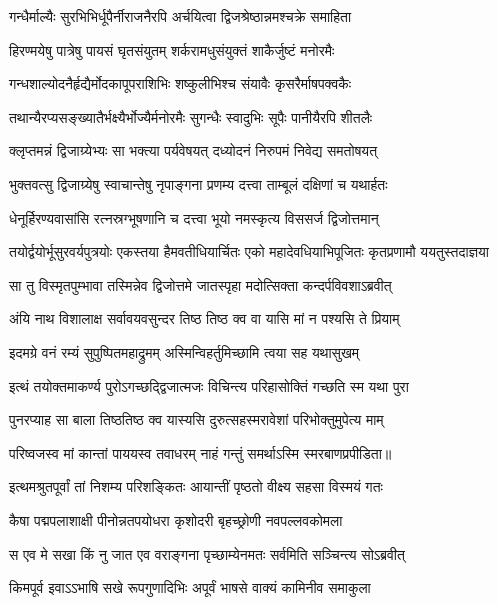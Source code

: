 \twolineshloka
{गन्धैर्माल्यैः सुरभिभिर्धूपैर्नीराजनैरपि}
{अर्चयित्वा द्विजश्रेष्ठान्नमश्चक्रे समाहिता} %

\twolineshloka
{हिरण्मयेषु पात्रेषु पायसं घृतसंयुतम्}
{शर्करामधुसंयुक्तं शाकैर्जुष्टं मनोरमैः} %

\twolineshloka
{गन्धशाल्योदनैर्हृद्यैर्मोदकापूपराशिभिः}
{शष्कुलीभिश्च संयावैः कृसरैर्माषपक्वकैः} %

\twolineshloka
{तथान्यैरप्यसङ्ख्यातैर्भक्ष्यैर्भोज्यैर्मनोरमैः}
{सुगन्धैः स्वादुभिः सूपैः पानीयैरपि शीतलैः} %

\twolineshloka
{क्लृप्तमन्नं द्विजाग्र्येभ्यः सा भक्त्या पर्यवेषयत्}
{दध्योदनं निरुपमं निवेद्य समतोषयत्} %

\twolineshloka
{भुक्तवत्सु द्विजाग्र्येषु स्वाचान्तेषु नृपाङ्गना}
{प्रणम्य दत्त्वा ताम्बूलं दक्षिणां च यथार्हतः} %

\twolineshloka
{धेनूर्हिरण्यवासांसि रत्नस्रग्भूषणानि च}
{दत्त्वा भूयो नमस्कृत्य विससर्ज द्विजोत्तमान्} %

\fourlineindentedshloka
{तयोर्द्वयोर्भूसुरवर्यपुत्रयोः}
{एकस्तया हैमवतीधियार्चितः}
{एको महादेवधियाभिपूजितः}
{कृतप्रणामौ ययतुस्तदाज्ञया} %

\twolineshloka
{सा तु विस्मृतपुम्भावा तस्मिन्नेव द्विजोत्तमे}
{जातस्पृहा मदोत्सिक्ता कन्दर्पविवशाऽब्रवीत्} %

\twolineshloka
{अंयि नाथ विशालाक्ष सर्वावयवसुन्दर}
{तिष्ठ तिष्ठ क्व वा यासि मां न पश्यसि ते प्रियाम्} %

\twolineshloka
{इदमग्रे वनं रम्यं सुपुष्पितमहाद्रुमम्}
{अस्मिन्विहर्तुमिच्छामि त्वया सह यथासुखम्} %

\twolineshloka
{इत्थं तयोक्तमाकर्ण्य पुरोऽगच्छद्द्विजात्मजः}
{विचिन्त्य परिहासोक्तिं गच्छति स्म यथा पुरा} %

\twolineshloka
{पुनरप्याह सा बाला तिष्ठतिष्ठ क्व यास्यसि}
{दुरुत्सहस्मरावेशां परिभोक्तुमुपेत्य माम्} %

\twolineshloka
{परिष्वजस्व मां कान्तां पाययस्व तवाधरम्}
{नाहं गन्तुं समर्थाऽस्मि स्मरबाणप्रपीडिता॥} %

\twolineshloka
{इत्थमश्रुतपूर्वां तां निशम्य परिशङ्कितः}
{आयान्तीं पृष्ठतो वीक्ष्य सहसा विस्मयं गतः} %

\twolineshloka
{कैषा पद्मपलाशाक्षी पीनोन्नतपयोधरा}
{कृशोदरी बृहच्छ्रोणी नवपल्लवकोमला} %

\twolineshloka
{स एव मे सखा किं नु जात एव वराङ्गना}
{पृच्छाम्येनमतः सर्वमिति सञ्चिन्त्य सोऽब्रवीत्} %

\twolineshloka
{किमपूर्व इवाऽऽभाषि सखे रूपगुणादिभिः}
{अपूर्वं भाषसे वाक्यं कामिनीव समाकुला} %

